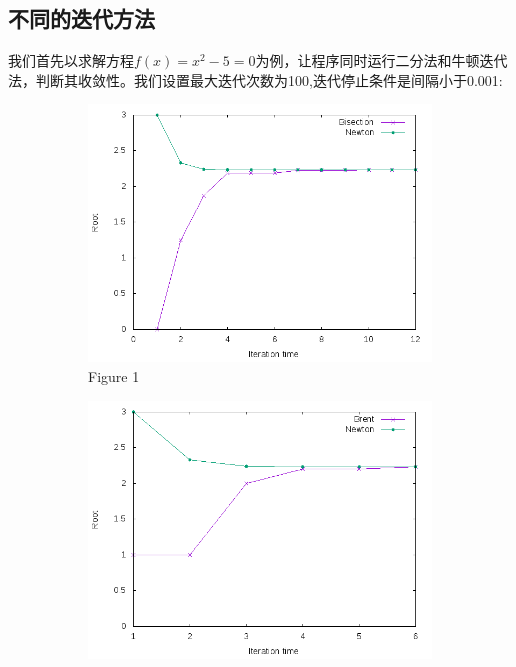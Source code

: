 \documentclass{ctexart}
\begin{document}
\subsection{不同的迭代方法}
我们首先以求解方程$f(x)=x^2-5=0$为例，让程序同时运行二分法和牛顿迭代法，判断其收敛性。我们设置最大迭代次数为100,迭代停止条件是间隔小于0.001:
\begin{figure}[H]
  \begin{subfigure}{0.3\linewidth}
  \centering
  \includegraphics[width=1\textwidth]{graph1.png}
  \caption{Figure 1}
  \label{fig:1}
  \end{subfigure}
  \begin{subfigure}{0.3\linewidth}
  \centering
  \includegraphics[width=1\textwidth]{graph2.png}

\end{subfigure}
\end{figure}
\end{document}
